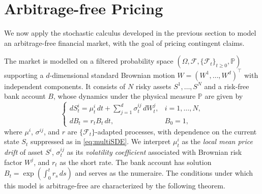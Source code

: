 



\section{Arbitrage-free Pricing}

We now apply the stochastic calculus developed in the previous section to model an arbitrage-free financial market, with the goal of pricing contingent claims.

The market is modelled on a filtered probability space $(\Omega, \mathcal{F}, 
\{\mathcal{F}_t\}_{t \geq 0}, \mathbb{P})$ supporting a $d$-dimensional 
standard Brownian motion $W = (W^1, \ldots, W^d)^\top$ with independent 
components. It consists of $N$ risky assets $S^1, \ldots, S^N$ and a 
risk-free bank account $B$, whose dynamics under the physical measure $\mathbb{P}$ are given by
\begin{equation}
    \begin{cases}
        dS_t^i = \mu_t^i \, dt + \displaystyle\sum_{j=1}^{d} 
        \sigma_t^{ij} \, dW_t^j, & i = 1, \ldots, N, \\[8pt]
        dB_t = r_t B_t \, dt, & B_0 = 1,
    \end{cases}
    \label{eq:market_dynamics}
\end{equation}
where $\mu^i$, $\sigma^{ij}$, and $r$ are $\{\mathcal{F}_t\}$-adapted processes, with dependence on the current state $S_t$ suppressed as in \eqref{eq:multiSDE}. We interpret $\mu_t^i$ as the \emph{local mean price drift} of asset $S^i$, $\sigma_t^{ij}$ as its \emph{volatility coefficient} associated with Brownian risk factor $W^j$, and $r_t$ as the short rate. The bank account has solution $B_t = \exp\!\left(\int_0^t r_s\, ds\right)$ and serves as the numeraire. The conditions under which this model is arbitrage-free are characterized 
by the following theorem.

